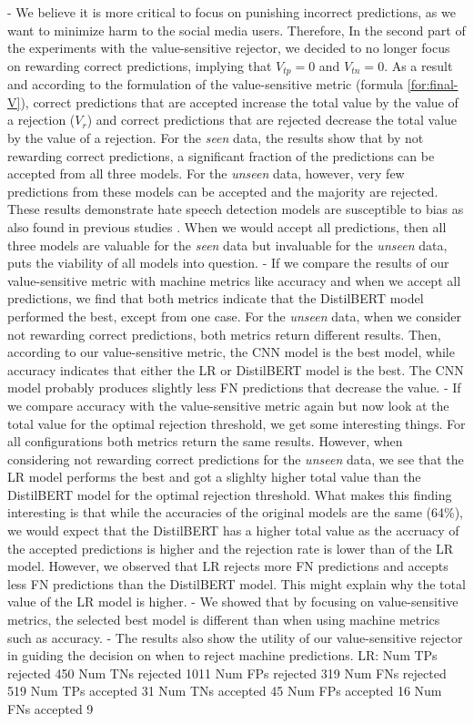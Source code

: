 - We believe it is more critical to focus on punishing incorrect predictions, as we want to minimize harm to the social media users. Therefore, In the second part of the experiments with the value-sensitive rejector, we decided to no longer focus on rewarding correct predictions, implying that $V_{tp}=0$ and $V_{tn}=0$. As a result and according to the formulation of the value-sensitive metric (formula \ref{for:final-V}), correct predictions that are accepted increase the total value by the value of a rejection ($V_r$) and correct predictions that are rejected decrease the total value by the value of a rejection. For the \emph{seen} data, the results show that by not rewarding correct predictions, a significant fraction of the predictions can be accepted from all three models. For the \emph{unseen} data, however, very few predictions from these models can be accepted and the majority are rejected. These results demonstrate hate speech detection models are susceptible to bias as also found in previous studies \citep{arango2019hate,grondahl2018all}. When we would accept all predictions, then all three models are valuable for the \emph{seen} data but invaluable for the \emph{unseen} data, puts the viability of all models into question.
- If we compare the results of our value-sensitive metric with machine metrics like accuracy and when we accept all predictions, we find that both metrics indicate that the DistilBERT model performed the best, except from one case. For the \emph{unseen} data, when we consider not rewarding correct predictions, both metrics return different results. Then, according to our value-sensitive metric, the CNN model is the best model, while accuracy indicates that either the LR or DistilBERT model is the best. The CNN model probably produces slightly less FN predictions that decrease the value.
- If we compare accuracy with the value-sensitive metric again but now look at the total value for the optimal rejection threshold, we get some interesting things. For all configurations both metrics return the same results. However, when considering not rewarding correct predictions for the \emph{unseen} data, we see that the LR model performs the best and got a slighlty higher total value than the DistilBERT model for the optimal rejection threshold. What makes this finding interesting is that while the accuracies of the original models are the same  (64\%), we would expect that the DistilBERT has a higher total value as the accruacy of the accepted predictions is higher and the rejection rate is lower than of the LR model. However, we observed that LR rejects more FN predictions and accepts less FN predictions than the DistilBERT model. This might explain why the total value of the LR model is higher.
- We showed that by focusing on value-sensitive metrics, the selected best model is different than when using machine metrics such as accuracy.
- The results also show the utility of our value-sensitive rejector in guiding the decision on when to reject machine predictions.
LR:
Num TPs rejected 450
Num TNs rejected 1011
Num FPs rejected 319
Num FNs rejected 519
Num TPs accepted 31
Num TNs accepted 45
Num FPs accepted 16
Num FNs accepted 9


